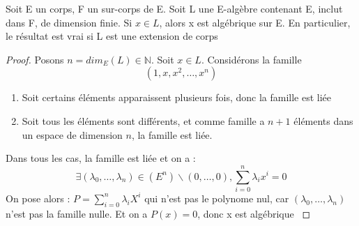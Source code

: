 \documentclass[a4paper,12pt,french]{report}
\begin{document}
			\begin{proposition}
				Soit E un corps, F un sur-corps de E. Soit L une E-algèbre contenant E, inclut dans F, de dimension finie. Si \(x \in L\), alors x est algébrique sur E. En particulier, le résultat est vrai si L est une extension de corps
			\end{proposition}
				\begin{proof}
					Posons \(n = dim_{E}(L) \in \mathbb{N} \). Soit \(x \in L \). Considérons la famille
					\[{}
						\left( 1 , x , x^{2} , \dots , x^{n} \right)
						\]
					\begin{enumerate}
						\item Soit certains éléments apparaissent plusieurs fois, donc la famille est liée
						\item Soit tous les éléments sont différents, et comme famille a \(n+1\) éléments dans un espace de dimension \(n\), la famille est liée.
					\end{enumerate}
					Dans tous les cas, la famille est liée et on a : 
						\[{}
							\exists (\lambda_{0},\dots,\lambda_{n}) \in (E^{n})\backslash {(0,\dots,0)}, \sum_{i = 0}^{n} \lambda_{i}x^{i} = 0
						\]
						On pose alors : \(P = \sum_{i = 0}^{n} \lambda_{i}X^{i} \) qui n'est pas le polynome nul, car \( (\lambda_{0},\dots,\lambda_{n}) \) n'est pas la famille nulle. Et on a \(P(x) = 0 \), donc x est algébrique  \( \)
				\end{proof}
			
\end{document}
